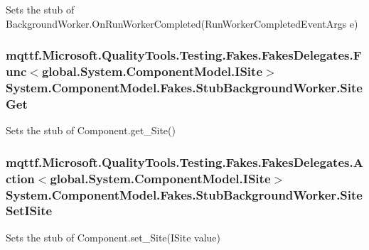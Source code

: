 Sets the stub of Background\-Worker.\-On\-Run\-Worker\-Completed(\-Run\-Worker\-Completed\-Event\-Args e)

\hypertarget{class_system_1_1_component_model_1_1_fakes_1_1_stub_background_worker_a66cf24129f03c49087642f576ced9a9e}{
\subsubsection[{Site\-Get}]{\setlength{\rightskip}{0pt plus 5cm}mqttf.\-Microsoft.\-Quality\-Tools.\-Testing.\-Fakes.\-Fakes\-Delegates.\-Func$<$global.\-System.\-Component\-Model.\-I\-Site$>$ System.\-Component\-Model.\-Fakes.\-Stub\-Background\-Worker.\-Site\-Get}}\label{class_system_1_1_component_model_1_1_fakes_1_1_stub_background_worker_a66cf24129f03c49087642f576ced9a9e}


Sets the stub of Component.\-get\-\_\-\-Site()

\hypertarget{class_system_1_1_component_model_1_1_fakes_1_1_stub_background_worker_a4c9d05712af98b2ce0414a684fce7c51}{
\subsubsection[{Site\-Set\-I\-Site}]{\setlength{\rightskip}{0pt plus 5cm}mqttf.\-Microsoft.\-Quality\-Tools.\-Testing.\-Fakes.\-Fakes\-Delegates.\-Action$<$global.\-System.\-Component\-Model.\-I\-Site$>$ System.\-Component\-Model.\-Fakes.\-Stub\-Background\-Worker.\-Site\-Set\-I\-Site}}\label{class_system_1_1_component_model_1_1_fakes_1_1_stub_background_worker_a4c9d05712af98b2ce0414a684fce7c51}


Sets the stub of Component.\-set\-\_\-\-Site(\-I\-Site value)

